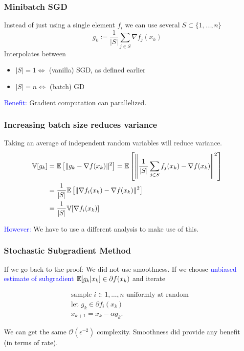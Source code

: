 \documentclass{beamer}
\begin{document}
\begin{frame}
  \frametitle{Minibatch SGD}
  Instead of just using a single element $f_i$ we can use several $S \subset \{1, \dots, n\}$
  \begin{equation}
    g_k := \frac{1}{\vert S \vert} \sum_{j\in S} \nabla f_j(x_k)
  \end{equation}
  Interpolates between
  \begin{itemize}
    \item $\vert S \vert=1 \Leftrightarrow $ (vanilla) SGD, as defined earlier
    \item $\vert S \vert= n \Leftrightarrow$ (batch) GD
  \end{itemize}

  \textcolor{blue}{Benefit:} Gradient computation can parallelized.

\end{frame}


\begin{frame}
  \frametitle{Increasing batch size reduces variance}

  Taking an average of independent random variables will reduce variance.
  \begin{align}
    \mathbb{V}[g_k] &= \mathbb{E} \left[ \Vert g_k - \nabla f(x_k) \Vert^2 \right] = \mathbb{E} \left[ \left\Vert \frac{1}{\vert S \vert} \sum_{j\in S} f_j(x_k) - \nabla f(x_k) \right\Vert^2 \right] \\
              &= \frac{1}{\vert S \vert} \mathbb{E} \left[\Vert \nabla f_i(x_k) - \nabla f(x_k) \Vert^2\right] \\
    &= \frac{1}{\vert S \vert} \mathbb{V}[ \nabla f_i(x_k) ]
  \end{align}

  \textcolor{blue}{However:} We have to use a different analysis to make use of this.
\end{frame}

\begin{frame}
  \frametitle{Stochastic Subgradient Method}

  If we go back to the proof: We did not use smoothness. If we choose \textcolor{blue}{unbiased estimate of subgradient} $\mathbb{E}[g_k|x_k] \in \partial f(x_k)$ and iterate
  \begin{block}{}
    \begin{align}
      &\text{sample $i\in 1,\dots, n$ uniformly at random} \\
      &\text{let $g_k \in \partial f_i(x_k)$}\\
      &x_{k+1} = x_k - \alpha g_k.
    \end{align}
  \end{block}
  We can get the same $\mathcal{O}(\epsilon^{-2})$ complexity. Smoothness did provide any benefit (in terms of rate).
\end{frame}
\end{document}
